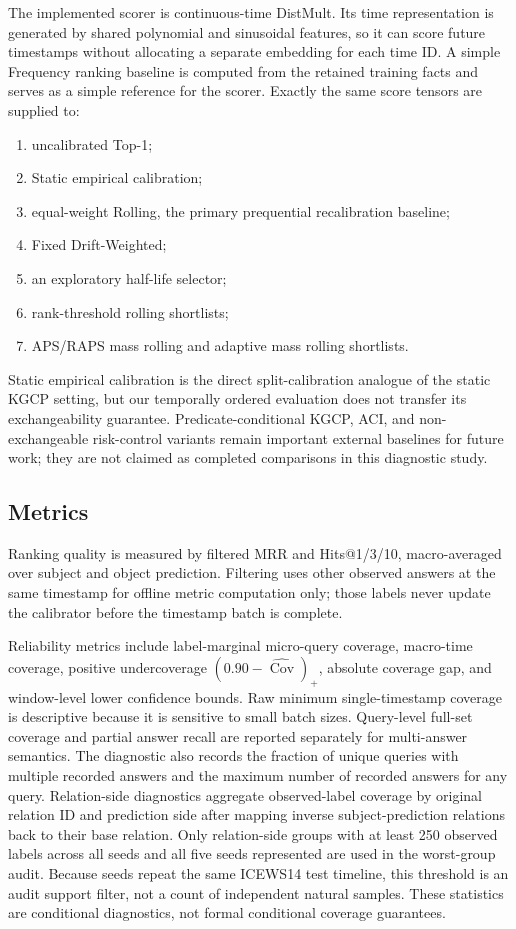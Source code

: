 \documentclass[10pt,twocolumn]{article}
\newcommand{\cov}{\operatorname{Cov}}
\begin{document}
The implemented scorer is continuous-time DistMult. Its time representation is
generated by shared polynomial and sinusoidal features, so it can score future
timestamps without allocating a separate embedding for each time ID. A simple
Frequency ranking baseline is computed from the retained training facts and
serves as a simple reference for the scorer. Exactly the same score tensors are
supplied to:
\begin{enumerate}[leftmargin=*]
  \item uncalibrated Top-1;
  \item Static empirical calibration;
  \item equal-weight Rolling, the primary prequential recalibration baseline;
  \item Fixed Drift-Weighted;
  \item an exploratory half-life selector;
  \item rank-threshold rolling shortlists;
  \item APS/RAPS mass rolling and adaptive mass rolling shortlists.
\end{enumerate}
Static empirical calibration is the direct split-calibration analogue of the
static KGCP setting, but our temporally ordered evaluation does not transfer its
exchangeability guarantee. Predicate-conditional KGCP, ACI, and
non-exchangeable risk-control variants remain important external baselines for
future work; they are not claimed as completed comparisons in this diagnostic
study.

\subsection{Metrics}

Ranking quality is measured by filtered MRR and Hits@1/3/10, macro-averaged over
subject and object prediction. Filtering uses other observed answers at the same
timestamp for offline metric computation only; those labels never update the
calibrator before the timestamp batch is complete.

Reliability metrics include label-marginal micro-query coverage, macro-time
coverage, positive undercoverage \((0.90-\widehat{\cov})_+\), absolute coverage
gap, and window-level lower confidence bounds. Raw minimum single-timestamp
coverage is descriptive because it is sensitive to small batch sizes. Query-level
full-set coverage and partial answer recall are reported separately for
multi-answer semantics. The diagnostic also records the fraction of unique
queries with multiple recorded answers and the maximum number of recorded
answers for any query.
Relation-side diagnostics aggregate observed-label coverage by original
relation ID and prediction side after mapping inverse subject-prediction
relations back to their base relation. Only relation-side groups with at least
250 observed labels across all seeds and all five seeds represented are used in
the worst-group audit. Because seeds repeat the same ICEWS14 test timeline, this
threshold is an audit support filter, not a count of independent natural
samples. These statistics are conditional diagnostics, not formal conditional
coverage guarantees.
\end{document}
